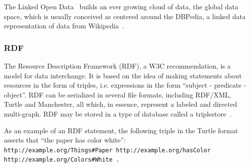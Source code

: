 The Linked Open Data~\cite{lod} builds an ever growing cloud of data,
the global data space, which is usually
conceived as centered around the DBPedia, a linked data representation
of data from Wikipedia~\cite{dbpedia0,dbpedia}.

\subsubsection{RDF}
The Resource Description Framework (RDF), a W3C
recommendation, is a model for data
interchange.
It is based on the idea of making statements about resources in the form
of triples, i.e. expressions in the form ``subject - predicate -
object''.
RDF can be serialized in several file formats, including RDF/XML,
Turtle and Manchester, all which, in essence, represent a labeled and
directed multi-graph.
RDF may be stored in a type of database called a triplestore~\cite{rdf}.

As an example of an RDF statement, the following triple in the Turtle
format asserts that ``the paper has color white'':\\
\texttt{http://example.org/Things\#Paper http://example.org/hasColor\\
http://example.org/Colors\#White .}

